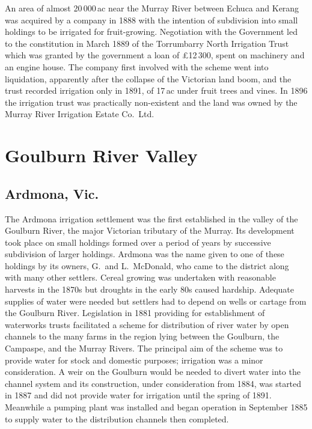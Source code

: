 An area of almost 20\,000\,ac near the Murray River between Echuca and
Kerang was acquired by a company in 1888 with the intention of
subdivision into small holdings to be irrigated for
fruit-growing.  Negotiation with the Government
led to the constitution in March 1889 of the Torrumbarry North
Irrigation Trust which was granted by the government a loan of
\pounds12\,300, spent on machinery and an engine house.  The company
first involved with the scheme went into liquidation, apparently after
the collapse of the Victorian land boom, and the trust recorded
irrigation only in 1891, of 17\,ac under fruit trees and
vines.
In 1896 the irrigation trust was practically non-existent and the land
was owned by the Murray River Irrigation Estate Co.\ Ltd.

\section*{Goulburn River Valley}

\subsection*{Ardmona, Vic.}

The Ardmona irrigation settlement was the first established in the
valley of the Goulburn River, the major Victorian tributary of the
Murray.  Its development took place on small holdings formed over a
period of years by successive subdivision of larger holdings.  Ardmona
was the name given to one of these holdings by its owners, G.~and
L.~McDonald, who came to the district along with many other settlers.
Cereal growing was undertaken with reasonable harvests in the 1870s
but droughts in the early 80s caused hardship.  Adequate supplies of
water were needed but settlers had to depend on wells or cartage from
the Goulburn River.  Legislation in 1881 providing for establishment
of waterworks trusts facilitated a scheme for distribution of river
water by open channels to the many farms in the region lying between
the Goulburn, the Campaspe, and the Murray Rivers.  The principal aim
of the scheme was to provide water for stock and domestic purposes;
irrigation was a minor consideration.  A weir on the Goulburn would be
needed to divert water into the channel system and its construction,
under consideration from 1884, was started in 1887 and did not provide
water for irrigation until the spring of 1891. Meanwhile a pumping plant
was installed and began operation in September 1885 to supply water to
the distribution channels then completed.

